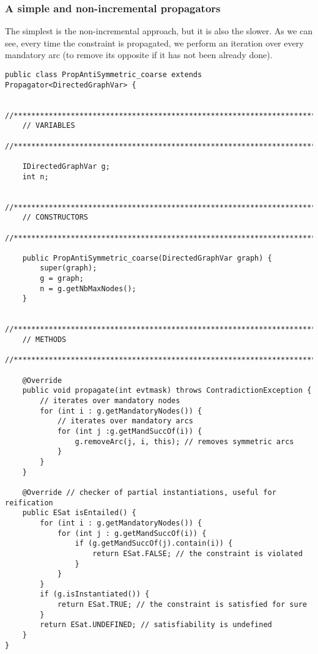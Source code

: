 \documentclass{article}
\begin{document}
\subsubsection{A simple and non-incremental propagators}

The simplest is the non-incremental approach, but it is also the slower. As we can see, every time the constraint is propagated, we perform an iteration over every mandatory arc (to remove its opposite if it has not been already done). 

\begin{lstlisting}
public class PropAntiSymmetric_coarse extends Propagator<DirectedGraphVar> {

    //*****************************************************************************
    // VARIABLES
    //*****************************************************************************

    IDirectedGraphVar g;
    int n;

    //*****************************************************************************
    // CONSTRUCTORS
    //*****************************************************************************

    public PropAntiSymmetric_coarse(DirectedGraphVar graph) {
        super(graph);
        g = graph;
        n = g.getNbMaxNodes();
    }

    //*****************************************************************************
    // METHODS
    //*****************************************************************************

    @Override
    public void propagate(int evtmask) throws ContradictionException {
        // iterates over mandatory nodes
        for (int i : g.getMandatoryNodes()) {
            // iterates over mandatory arcs
            for (int j :g.getMandSuccOf(i)) {
                g.removeArc(j, i, this); // removes symmetric arcs
            }
        }
    }

    @Override // checker of partial instantiations, useful for reification
    public ESat isEntailed() {
        for (int i : g.getMandatoryNodes()) {
            for (int j : g.getMandSuccOf(i)) {
                if (g.getMandSuccOf(j).contain(i)) {
                    return ESat.FALSE; // the constraint is violated
                }
            }
        }
        if (g.isInstantiated()) {
            return ESat.TRUE; // the constraint is satisfied for sure
        }
        return ESat.UNDEFINED; // satisfiability is undefined
    }
}
\end{lstlisting}
\end{document}
